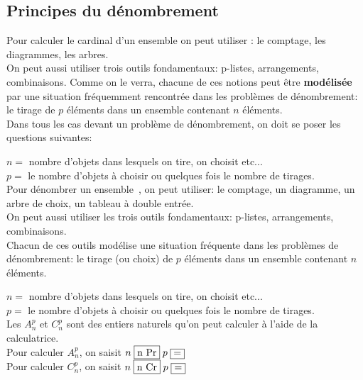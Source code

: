 \subsection{Principes du dénombrement}
Pour calculer le cardinal d'un ensemble on peut utiliser : le comptage, les diagrammes, les arbres.\\
On peut aussi utiliser trois outils fondamentaux:  p-listes,  arrangements,  combinaisons. Comme on le verra, chacune de ces notions peut être \textbf{modélisée} par une situation fréquemment rencontrée dans les problèmes de dénombrement: le tirage de $ p $ éléments dans un ensemble contenant  $ n $  éléments.\\ Dans tous les cas devant un problème de dénombrement, on doit se poser les questions suivantes:

 
  $ n= $ nombre d'objets dans lesquels on tire, on choisit etc...\\
  $ p= $  le nombre d'objets à choisir ou quelques fois le nombre de tirages.\\
  
Pour dénombrer un ensemble~, on peut utiliser: le comptage, un diagramme, un arbre de choix, un tableau à double entrée.\\
On peut aussi utiliser les trois outils fondamentaux:  p-listes,  arrangements,  combinaisons.\\ Chacun de ces outils  modélise  une situation fréquente  dans les problèmes de dénombrement: le tirage (ou choix) de $ p $ éléments dans un ensemble contenant  $ n $  éléments.

 
  $ n= $ nombre d'objets dans lesquels on tire, on choisit etc...\\
  $ p= $  le nombre d'objets à choisir ou quelques fois le nombre de tirages.\\
  
Les $A_{n}^{p} $ et  $C_{n}^{p} $ sont des entiers naturels qu'on peut calculer à l'aide de la calculatrice.\\
 Pour calculer $A_{n}^{p} $, on saisit $ n\; \fbox{n Pr}\; p\;\fbox{=}$\\
 Pour calculer $C_{n}^{p} $, on saisit  $ n\; \fbox{n Cr}\; p\;\fbox{=}$\\

